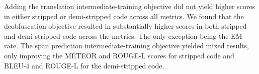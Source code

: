 Adding the translation intermediate-training objective did not yield higher scores in either stripped or demi-stripped code across all metrics. We found that the deobfuscation objective resulted in substantially higher scores in both stripped and demi-stripped code across the metrics. The only exception being the EM rate. The span prediction intermediate-training objective yielded mixed results, only improving the METEOR and ROUGE-L scores for stripped code and BLEU-4 and ROUGE-L for the demi-stripped code.
